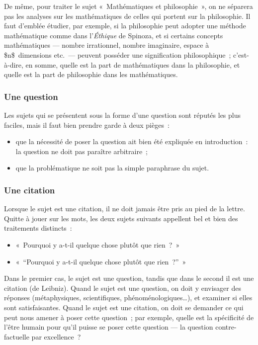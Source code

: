 \documentclass[a4paper]{article}
\begin{document}
De même, pour traiter le sujet « Mathématiques et philosophie », on ne
séparera pas les analyses sur les mathématiques de celles qui portent
sur la philosophie. Il faut d'emblée étudier, par exemple, si la
philosophie peut adopter une méthode mathématique comme dans l'\emph{Éthique}
de Spinoza, et si certains concepts mathématiques --- nombre
irrationnel, nombre imaginaire, espace à \$n\$ dimensions etc. --- peuvent
posséder une signification philosophique ; c'est-à-dire, en somme,
quelle est la part de mathématiques dans la philosophie, et quelle est
la part de philosophie dans les mathématiques.
\subsubsection{Une question}
\label{sec-3-1-3}


Les sujets qui se présentent sous la forme d'une question sont réputés
les plus faciles, mais il faut bien prendre garde à deux pièges :

\begin{itemize}
\item que la nécessité de poser la question ait bien été expliquée en
   introduction : la question ne doit pas paraître arbitraire ;
\item que la problématique ne soit pas la simple paraphrase du sujet.
\end{itemize}
\subsubsection{Une citation}
\label{sec-3-1-4}


Lorsque le sujet est une citation, il ne doit jamais être pris au pied
de la lettre. Quitte à jouer sur les mots, les deux sujets suivants
appellent bel et bien des traitements distincts :

\begin{itemize}
\item « Pourquoi y a-t-il quelque chose plutôt que rien ? »
\item « ``Pourquoi y a-t-il quelque chose plutôt que rien ?'' »
\end{itemize}

Dans le premier cas, le sujet est une question, tandis que dans le
second il est une citation (de Leibniz). Quand le sujet est une
question, on doit y envisager des réponses (métaphysiques,
scientifiques, phénoménologiques\ldots{}), et examiner si elles sont
satisfaisantes. Quand le sujet est une citation, on doit se demander ce
qui peut nous amener à poser cette question ; par exemple, quelle est la
spécificité de l'être humain pour qu'il puisse se poser cette question
--- la question contre-factuelle par excellence ?
\end{document}
